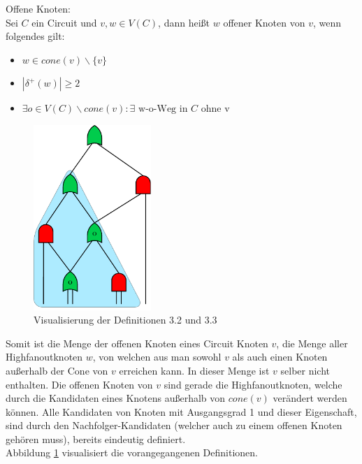 \documentclass[11pt, a4paper, german]{article}
\begin{document}
\begin{definition}{Offene Knoten:}\\
	Sei $C$ ein Circuit und $v,w \in V(C)$, dann heißt $w$ offener Knoten von $v$, wenn folgendes gilt: 
	\begin{itemize}
		\item $ w \in cone(v)\backslash \{ v \} $
		\item $| \delta ^{+}(w)| \geq 2$
		\item $ \exists o \in V(C) \backslash cone(v) : \exists \text{ w-o-Weg in } C \text{ ohne v} $
	\end{itemize}	
\end{definition}
 \begin{figure}
		\includegraphics[height = 7cm]{pictures/compiled/cone}
		\caption{Visualisierung der Definitionen 3.2 und 3.3}
		\label{bild:cone}
\end{figure}
Somit ist die Menge der offenen Knoten eines Circuit Knoten $v$, die Menge aller Highfanoutknoten $w$, von welchen aus man sowohl $v$ als auch einen Knoten außerhalb der Cone von $v$ erreichen kann. In dieser Menge ist $v$ selber nicht enthalten. Die offenen Knoten von $v$ sind gerade die Highfanoutknoten, welche durch die Kandidaten eines Knotens außerhalb von $cone(v)$ verändert werden können. Alle Kandidaten von  Knoten mit Ausgangsgrad 1 und dieser Eigenschaft, sind durch den Nachfolger-Kandidaten (welcher auch zu einem offenen Knoten gehören muss), bereits eindeutig definiert. \\
Abbildung \ref{bild:cone} visualisiert die vorangegangenen Definitionen.
\end{document}
